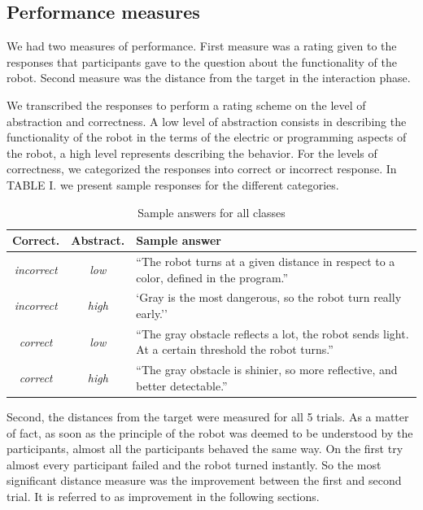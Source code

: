 \documentclass{sig-alternate}
\begin{document}
\subsection{Performance measures}

We had two measures of performance. First measure was a rating given to
the responses that participants gave to the question about the
functionality of the robot. Second measure was the distance from the
target in the interaction phase.

We transcribed the responses to perform a rating scheme on the level of
abstraction and correctness. A low level of abstraction consists in
describing the functionality of the robot in the terms of the electric
or programming aspects of the robot, a high level represents describing
the behavior. For the levels of correctness, we categorized the
responses into correct or incorrect response. In TABLE I. we present
sample responses for the different categories.

\begin{table}[ht!]
    \centering
    \footnotesize
    \begin{tabular}{ccp{4.5cm}}
        \toprule
        Correct. & Abstract. & Sample answer \\
        \midrule
        \textit{incorrect} & \textit{low} & ``The robot turns at a given distance in respect to a color, defined in the program.''\\ 
        \midrule
        \textit{incorrect} & \textit{high} & `Gray is the most dangerous, so the
        robot turn really early.''\\ 
        \midrule
        \textit{correct} & \textit{low} & ``The gray obstacle reflects a lot,
        the robot sends light. At a certain threshold the robot turns.'' \\ 
        \midrule
        \textit{correct} & \textit{high} & ``The gray obstacle is shinier, so
        more reflective, and better detectable.''\\ 
        \bottomrule
    \end{tabular}
    \caption{Sample answers for all classes}

    \label{sample_answer}
\end{table}

Second, the distances from the target were measured for all 5 trials. As
a matter of fact, as soon as the principle of the robot was deemed to be
understood by the participants, almost all the participants behaved the
same way. On the first try almost every participant failed and the robot
turned instantly. So the most significant distance measure was the
improvement between the first and second trial. It is referred to as
improvement in the following sections.
\end{document}
